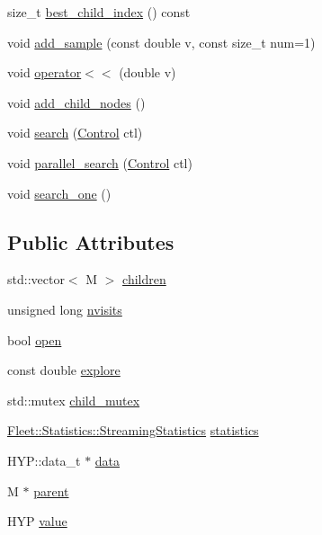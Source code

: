 \begin{DoxyCompactItemize}
\item 
size\+\_\+t \hyperlink{class_m_c_t_s_node_a64290d7134b6841a49e84a244512bd19}{best\+\_\+child\+\_\+index} () const
\item 
void \hyperlink{class_m_c_t_s_node_a1c6a25035bdfd87764072f3a5df16715}{add\+\_\+sample} (const double v, const size\+\_\+t num=1)
\item 
void \hyperlink{class_m_c_t_s_node_ad72e84b8b8c6e814dfae4a697ddb6acd}{operator$<$$<$} (double v)
\item 
void \hyperlink{class_m_c_t_s_node_adf984e74107202a9891e6338eef53ea2}{add\+\_\+child\+\_\+nodes} ()
\item 
void \hyperlink{class_m_c_t_s_node_a0cf85ac07dd2a3f21fea0737834b8cf1}{search} (\hyperlink{struct_control}{Control} ctl)
\item 
void \hyperlink{class_m_c_t_s_node_acd94e02e155886ab71a2922815cd8285}{parallel\+\_\+search} (\hyperlink{struct_control}{Control} ctl)
\item 
void \hyperlink{class_m_c_t_s_node_ad0766d2829bb1cb252dd6aac51ac0d95}{search\+\_\+one} ()
\end{DoxyCompactItemize}
\subsection*{Public Attributes}
\begin{DoxyCompactItemize}
\item 
std\+::vector$<$ M $>$ \hyperlink{class_m_c_t_s_node_a243b348036c57a54af3a48a708851b80}{children}
\item 
unsigned long \hyperlink{class_m_c_t_s_node_a277d083d477ab4aaeeadfadada1cdc24}{nvisits}
\item 
bool \hyperlink{class_m_c_t_s_node_aa4d0f6bb2603cfe995aaafc5d208ec16}{open}
\item 
const double \hyperlink{class_m_c_t_s_node_ad1a742de2cdd0e208079bc35f943cacc}{explore}
\item 
std\+::mutex \hyperlink{class_m_c_t_s_node_a66790ec812754c13bab5f6f14966bacf}{child\+\_\+mutex}
\item 
\hyperlink{class_fleet_1_1_statistics_1_1_streaming_statistics}{Fleet\+::\+Statistics\+::\+Streaming\+Statistics} \hyperlink{class_m_c_t_s_node_a47cdbf0ef4f1e6ccbb6e911d4d384f39}{statistics}
\item 
H\+Y\+P\+::data\+\_\+t $\ast$ \hyperlink{class_m_c_t_s_node_a736868beae8f1925081e2ec471742b8c}{data}
\item 
M $\ast$ \hyperlink{class_m_c_t_s_node_ab451a032b940daa976b7a5773d3246ca}{parent}
\item 
H\+YP \hyperlink{class_m_c_t_s_node_a0442ab9a9378dabcd98ac7254b2e70a8}{value}
\end{DoxyCompactItemize}


